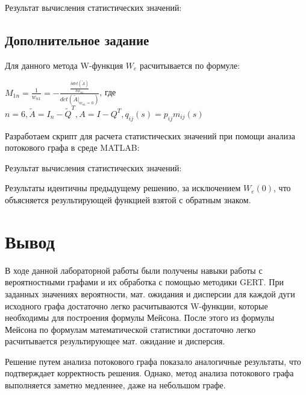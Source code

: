\documentclass[14pt,a4paper,report]{report}
\begin{document}


Результат вычисления статистических значений:



\subsection{Дополнительное задание}

Для данного метода W-функция $W_e$ расчитывается по формуле:

$M_{1n}=\frac{1}{w_{n1}}=-\frac{\frac{\delta det(\tilde{A})}{\delta w_{n1}}}{det(\tilde{A}|_{w_{n1}=0})}$, где\\

$n=6,\tilde{A}=I_n-\tilde{Q}^T,A=I-Q^T,q_{ij}(s)=p_{ij}m_{ij}(s)$

Разработаем скрипт для расчета статистических значений при помощи анализа потокового графа в среде MATLAB:



Результат вычисления статистических значений:



Результаты идентичны предыдущему решению, за исключением $W_e(0)$, что объясняется результирующей функцией взятой с обратным знаком.

\section{Вывод}

В ходе данной лабораторной работы были получены навыки работы с вероятностными графами и их обработка с помощью методики GERT. При заданных значениях вероятности, мат. ожидания и дисперсии для каждой дуги исходного графа достаточно легко расчитываются W-функции, которые необходимы для построения формулы Мейсона. После этого из формулы Мейсона по формулам математической статистики достаточно легко расчитывается результирующее мат. ожидание и дисперсия.

Решение путем анализа потокового графа показало аналогичные результаты, что подтверждает корректность решения. Однако, метод анализа потокового графа выполняется заметно медленнее, даже на небольшом графе.
\end{document}

